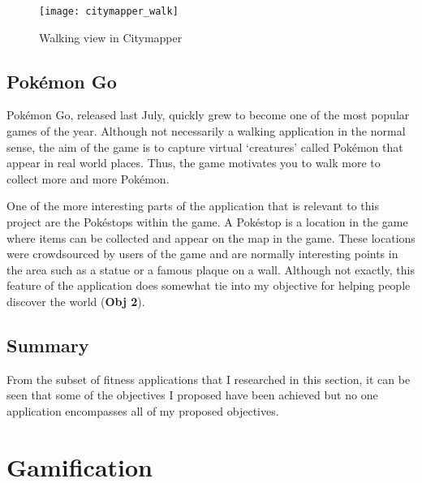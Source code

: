\begin{figure}[hbt]
  \centering
  \texttt{[image: citymapper\_walk]}
  \caption{Walking view in Citymapper}
  \label{fig:citymapper-walk}
\end{figure}



\subsection{Pok\'{e}mon Go}

Pok\'{e}mon Go, released last July, quickly grew to become one of the most popular games of the year. Although not necessarily a walking application in the normal sense, the aim of the game is to capture virtual `creatures' called Pok\'{e}mon that appear in real world places. Thus, the game motivates you to walk more to collect more and more Pok\'{e}mon.

One of the more interesting parts of the application that is relevant to this project are the Pok\'{e}stops within the game. A Pok\'{e}stop is a location in the game where items can be collected and appear on the map in the game. These locations were crowdsourced by users of the game and are normally interesting points in the area such as a statue or a famous plaque on a wall. Although not exactly, this feature of the application does somewhat tie into my objective for helping people discover the world (\textbf{Obj 2}).



\subsection{Summary}

From the subset of fitness applications that I researched in this section, it can be seen that some of the objectives I proposed have been achieved but no one application encompasses all of my proposed objectives.

\section{Gamification}



